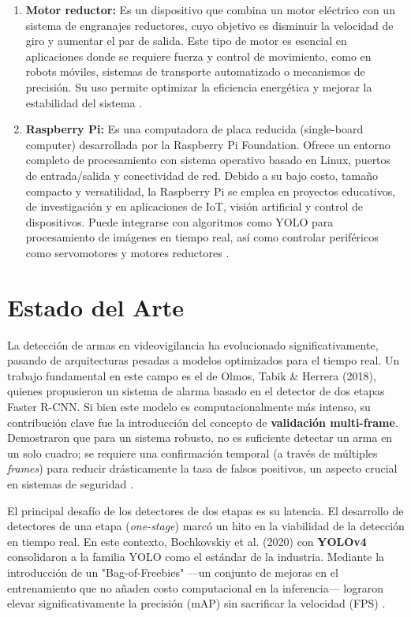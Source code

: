 \documentclass{article}
\begin{document}
\begin{enumerate}
    \item \textbf{Motor reductor: } Es un dispositivo que combina un motor eléctrico con un sistema de engranajes reductores, cuyo objetivo es disminuir la velocidad de giro y aumentar el par de salida. Este tipo de motor es esencial en aplicaciones donde se requiere fuerza y control de movimiento, como en robots móviles, sistemas de transporte automatizado o mecanismos de precisión. Su uso permite optimizar la eficiencia energética y mejorar la estabilidad del sistema \cite{ingmecafenix_motorreductor_2025}.

    \item \textbf{Raspberry Pi: } Es una computadora de placa reducida (single-board computer) desarrollada por la Raspberry Pi Foundation. Ofrece un entorno completo de procesamiento con sistema operativo basado en Linux, puertos de entrada/salida y conectividad de red. Debido a su bajo costo, tamaño compacto y versatilidad, la Raspberry Pi se emplea en proyectos educativos, de investigación y en aplicaciones de IoT, visión artificial y control de dispositivos. Puede integrarse con algoritmos como YOLO para procesamiento de imágenes en tiempo real, así como controlar periféricos como servomotores y motores reductores \cite{hardzone_raspberrypi_2025}.

\end{enumerate}


\section{Estado del Arte}

La detección de armas en videovigilancia ha evolucionado significativamente, pasando de arquitecturas pesadas a modelos optimizados para el tiempo real. Un trabajo fundamental en este campo es el de Olmos, Tabik \& Herrera (2018), quienes propusieron un sistema de alarma basado en el detector de dos etapas Faster R-CNN. Si bien este modelo es computacionalmente más intenso, su contribución clave fue la introducción del concepto de \textbf{validación multi-frame}. Demostraron que para un sistema robusto, no es suficiente detectar un arma en un solo cuadro; se requiere una confirmación temporal (a través de múltiples \textit{frames}) para reducir drásticamente la tasa de falsos positivos, un aspecto crucial en sistemas de seguridad \cite{olmos_2018}.

El principal desafío de los detectores de dos etapas es su latencia. El desarrollo de detectores de una etapa (\textit{one-stage}) marcó un hito en la viabilidad de la detección en tiempo real. En este contexto, Bochkovskiy et al. (2020) con \textbf{YOLOv4} consolidaron a la familia YOLO como el estándar de la industria. Mediante la introducción de un "Bag-of-Freebies" —un conjunto de mejoras en el entrenamiento que no añaden costo computacional en la inferencia— lograron elevar significativamente la precisión (mAP) sin sacrificar la velocidad (FPS) \cite{bochkovskiy_2020}.
\end{document}
